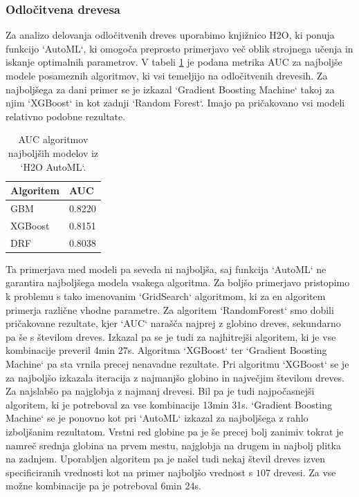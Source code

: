 \documentclass{article}
\begin{document}
\subsubsection{Odločitvena drevesa}
Za analizo delovanja odločitvenih dreves uporabimo knjižnico H2O, ki ponuja funkcijo `AutoML`, ki omogoča preprosto primerjavo več oblik strojnega učenja in iskanje optimalnih parametrov. V tabeli \ref{tab:automl} je podana metrika AUC za najboljše modele posameznih algoritmov, ki vsi temeljijo na odločitvenih drevesih. Za najboljšega za dani primer se je izkazal `Gradient Boosting Machine` takoj za njim `XGBoost` in kot zadnji `Random Forest`. Imajo pa pričakovano vsi modeli relativno podobne rezultate. 
\begin{table}[H]
\centering
\begin{tabular}{|l|l|}
\hline
\textbf{Algoritem} & \textbf{AUC} \\ \hline
GBM & 0.8220 \\ \hline
XGBoost & 0.8151 \\ \hline
DRF & 0.8038 \\ \hline
\end{tabular}
\caption{AUC algoritmov najboljših modelov iz `H2O AutoML`.}
\label{tab:automl}
\end{table}
Ta primerjava med modeli pa seveda ni najboljša, saj funkcija `AutoML` ne garantira najboljšega modela vsakega algoritma. Za boljšo primerjavo pristopimo k problemu s tako imenovanim `GridSearch` algoritmom, ki za en algoritem primerja različne vhodne parametre. Za algoritem `RandomForest` smo dobili pričakovane rezultate, kjer `AUC` narašča najprej z globino dreves, sekundarno pa še s številom dreves. Izkazal pa se je tudi za najhitrejši algoritem, ki je vse kombinacije preveril 4min 27s. Algoritma `XGBoost` ter `Gradient Boosting Machine` pa sta vrnila precej nenavadne rezultate. Pri algoritmu `XGBoost` se je za najboljšo izkazala iteracija z najmanjšo globino in največjim številom dreves. Za najslabšo pa najglobja z najmanj drevesi. Bil pa je tudi najpočasnejši algoritem, ki je potreboval za vse kombinacije 13min 31s. `Gradient Boosting Machine` se je ponovno kot pri `AutoML` izkazal za najboljšega z rahlo izboljšanim rezultatom. Vrstni red globine pa je še precej bolj 
zanimiv tokrat je namreč srednja globina na prvem mestu, najglobja na drugem in najbolj plitka na zadnjem. Uporabljen algoritem pa je našel tudi nekaj števil dreves izven specificiranih vrednosti kot na primer najboljšo vrednost s $107$ drevesi. Za vse možne kombinacije pa je potreboval 6min 24s.
\end{document}
